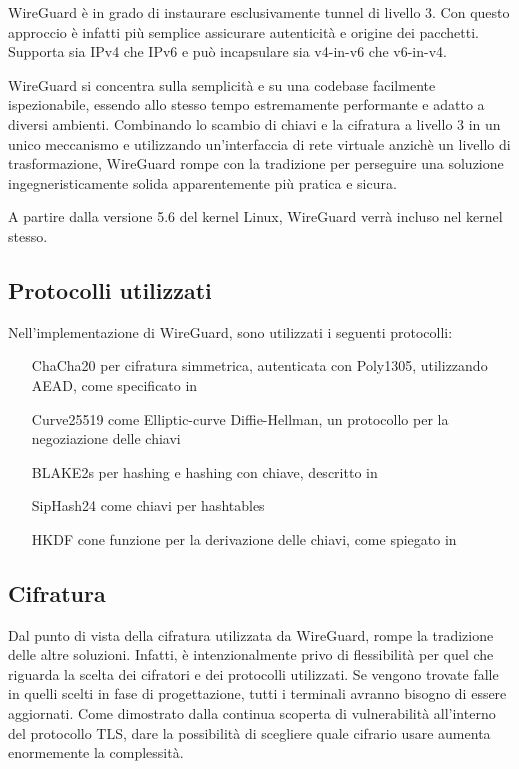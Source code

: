 WireGuard è in grado di instaurare esclusivamente tunnel di livello 3. Con questo approccio è infatti più semplice assicurare autenticità e origine dei pacchetti. Supporta sia IPv4 che IPv6 e può incapsulare sia v4-in-v6 che v6-in-v4.

WireGuard si concentra sulla semplicità e su una codebase facilmente ispezionabile, essendo allo stesso tempo estremamente performante e adatto a diversi ambienti. Combinando lo scambio di chiavi e la cifratura a livello 3 in un unico meccanismo e utilizzando un'interfaccia di rete virtuale anzichè un livello di trasformazione, WireGuard rompe con la tradizione per perseguire una soluzione ingegneristicamente solida apparentemente più pratica e sicura.

A partire dalla versione 5.6 del kernel Linux, WireGuard verrà incluso nel kernel stesso.
\subsection{Protocolli utilizzati}
Nell'implementazione di WireGuard, sono utilizzati i seguenti protocolli:
\begin{itemize}
    \item[ChaCha20] per cifratura simmetrica, autenticata con Poly1305, utilizzando AEAD, come specificato in \cite[RFC7539]{RFC7539}
    \item[Curve25519] come Elliptic-curve Diffie-Hellman, un protocollo per la negoziazione delle chiavi
    \item[BLAKE2s] per hashing e hashing con chiave, descritto in \cite[RFC7693]{RFC7693}
    \item[SipHash24] come chiavi per hashtables
    \item[HKDF] cone funzione per la derivazione delle chiavi, come spiegato in \cite[RFC5869]{RFC5869}
\end{itemize}

\subsection{Cifratura}
Dal punto di vista della cifratura utilizzata da WireGuard, rompe la tradizione delle altre soluzioni. Infatti, è intenzionalmente privo di flessibilità per quel che riguarda la scelta dei cifratori e dei protocolli utilizzati. Se vengono trovate falle in quelli scelti in fase di progettazione, tutti i terminali avranno bisogno di essere aggiornati. Come dimostrato dalla continua scoperta di vulnerabilità all'interno del protocollo TLS, dare la possibilità di scegliere quale cifrario usare aumenta enormemente la complessità.

